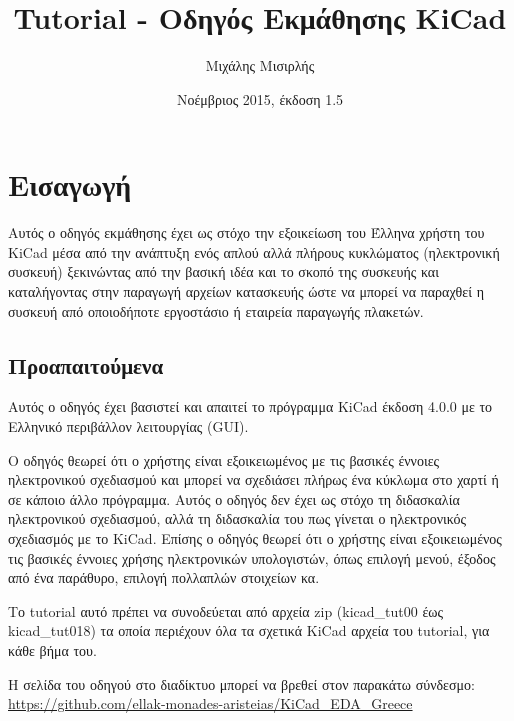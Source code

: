 \documentclass[a4paper]{article}
\title{Tutorial - Οδηγός Εκμάθησης KiCad}
\author{Μιχάλης Μισιρλής}
\date{Νοέμβριος 2015, έκδοση 1.5}
\begin{document}
\maketitle

\pagebreak
\tableofcontents
\pagebreak

\newpage
\section{Εισαγωγή}
Αυτός ο οδηγός εκμάθησης έχει ως στόχο την εξοικείωση του Έλληνα χρήστη του \textenglish{KiCad} μέσα από την ανάπτυξη ενός απλού αλλά πλήρους κυκλώματος (ηλεκτρονική συσκευή) ξεκινώντας από την βασική ιδέα και το σκοπό της συσκευής και καταλήγοντας στην παραγωγή αρχείων κατασκευής ώστε να μπορεί να παραχθεί η συσκευή από οποιοδήποτε εργοστάσιο ή εταιρεία παραγωγής πλακετών.

\subsection{Προαπαιτούμενα}
\label{sec:prereq}
Αυτός ο οδηγός έχει βασιστεί και απαιτεί το πρόγραμμα \textenglish{KiCad} έκδοση 4.0.0 με το Ελληνικό περιβάλλον λειτουργίας (GUI).

Ο οδηγός θεωρεί ότι ο χρήστης είναι εξοικειωμένος με τις βασικές έννοιες ηλεκτρονικού σχεδιασμού και μπορεί να σχεδιάσει πλήρως ένα κύκλωμα στο χαρτί ή σε κάποιο άλλο πρόγραμμα. Αυτός ο οδηγός δεν έχει ως στόχο τη διδασκαλία ηλεκτρονικού σχεδιασμού, αλλά τη διδασκαλία του πως γίνεται ο ηλεκτρονικός σχεδιασμός με το \textenglish{KiCad}. Επίσης ο οδηγός θεωρεί ότι ο χρήστης είναι εξοικειωμένος τις βασικές έννοιες χρήσης ηλεκτρονικών υπολογιστών, όπως επιλογή μενού, έξοδος από ένα παράθυρο, επιλογή πολλαπλών στοιχείων κα.


Το tutorial αυτό πρέπει να συνοδεύεται από αρχεία zip (kicad\_tut00 έως kicad\_tut018) τα οποία περιέχουν όλα τα σχετικά \textenglish{KiCad} αρχεία του tutorial, για κάθε βήμα του. 

Η σελίδα του οδηγού στο διαδίκτυο μπορεί να βρεθεί στον παρακάτω σύνδεσμο:\\
\href{https://github.com/ellak-monades-aristeias/KiCad\_EDA\_Greece}{https://github.com/ellak-monades-aristeias/KiCad\_EDA\_Greece}
\end{document}
